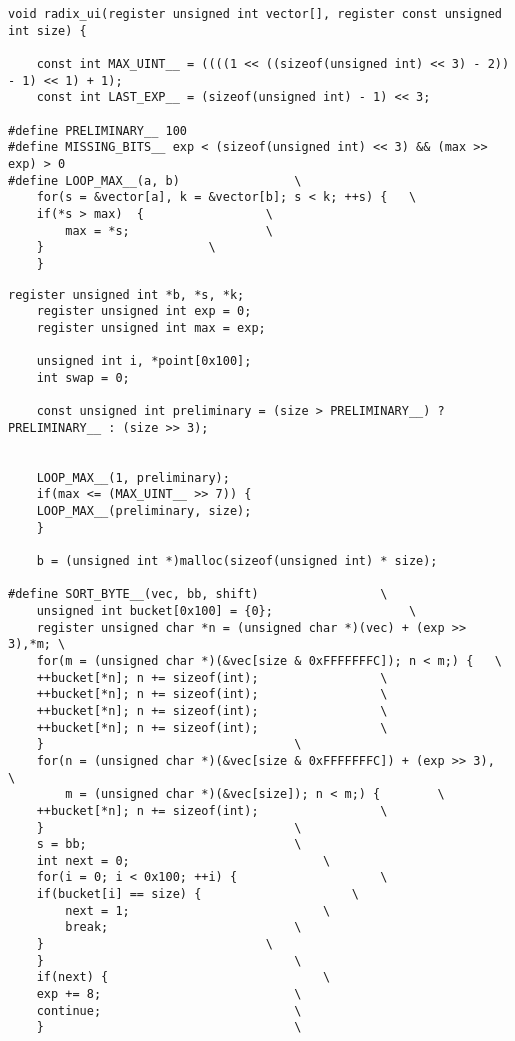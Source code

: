 \begin{lstlisting}[caption=Алгоритм поразрядной сортировки]
void radix_ui(register unsigned int vector[], register const unsigned int size) {

    const int MAX_UINT__ = ((((1 << ((sizeof(unsigned int) << 3) - 2)) - 1) << 1) + 1);
    const int LAST_EXP__ = (sizeof(unsigned int) - 1) << 3;
    
#define PRELIMINARY__ 100
#define MISSING_BITS__ exp < (sizeof(unsigned int) << 3) && (max >> exp) > 0
#define LOOP_MAX__(a, b)				\
    for(s = &vector[a], k = &vector[b]; s < k; ++s) {	\
	if(*s > max)  {					\
	    max = *s;					\
	}						\
    }
    \end{lstlisting}
    \begin{lstlisting}[caption=Алгоритм поразрядной сортировки]
    register unsigned int *b, *s, *k;
    register unsigned int exp = 0;
    register unsigned int max = exp;

    unsigned int i, *point[0x100];
    int swap = 0;
    
    const unsigned int preliminary = (size > PRELIMINARY__) ? PRELIMINARY__ : (size >> 3);
    

    LOOP_MAX__(1, preliminary);
    if(max <= (MAX_UINT__ >> 7)) {	
	LOOP_MAX__(preliminary, size);
    }
    
    b = (unsigned int *)malloc(sizeof(unsigned int) * size);
    
#define SORT_BYTE__(vec, bb, shift)					\
    unsigned int bucket[0x100] = {0};					\
    register unsigned char *n = (unsigned char *)(vec) + (exp >> 3),*m; \
    for(m = (unsigned char *)(&vec[size & 0xFFFFFFFC]); n < m;) {	\
	++bucket[*n]; n += sizeof(int);					\
	++bucket[*n]; n += sizeof(int);					\
	++bucket[*n]; n += sizeof(int);					\
	++bucket[*n]; n += sizeof(int);					\
    }									\
    for(n = (unsigned char *)(&vec[size & 0xFFFFFFFC]) + (exp >> 3),	\
	    m = (unsigned char *)(&vec[size]); n < m;) {		\
	++bucket[*n]; n += sizeof(int);					\
    }									\
    s = bb;								\
    int next = 0;							\
    for(i = 0; i < 0x100; ++i) {					\
	if(bucket[i] == size) {						\
	    next = 1;							\
	    break;							\
	}								\
    }									\
    if(next) {								\
	exp += 8;							\
	continue;							\
    }									\
    \end{lstlisting}
